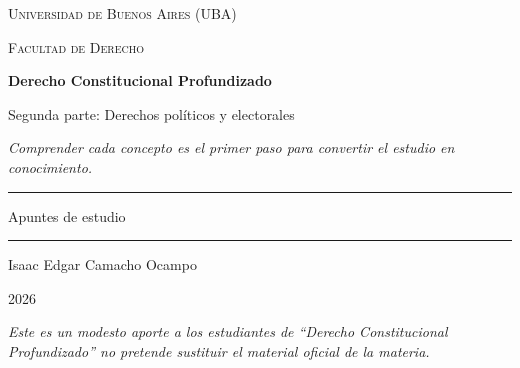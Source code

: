\documentclass[12pt,oneside]{book}
\newcommand{\universidad}{Universidad de Buenos Aires (UBA)}
\newcommand{\facultad}{Facultad de Derecho}
\newcommand{\materia}{Derecho Constitucional Profundizado}
\newcommand{\titulo}{Segunda parte: Derechos políticos y electorales}
\newcommand{\autor}{Isaac Edgar Camacho Ocampo}
\newcommand{\anio}{2026}
\newcommand{\reflexion}{Comprender cada concepto es el primer paso para convertir el estudio en conocimiento.}
\begin{document}
\begin{titlepage}

\thispagestyle{empty}

\begin{center}

\vspace*{1cm}

{\large \textsc{\universidad}}

\vspace{0.2cm}

{\large \textsc{\facultad}}

\vspace{3cm}

{\Huge \textbf{\materia}}

\vspace{1cm}

{\LARGE \titulo}

\vspace{0.8cm}

\textit{\reflexion}

\vspace{1.2cm}

\rule{0.70\textwidth}{0.5pt}

\vspace{0.5cm}

{\large Apuntes de estudio}

\vspace{0.5cm}

\rule{0.70\textwidth}{0.5pt}

\vfill

{\large \autor}

\vspace{0.3cm}

{\large \anio}

\end{center}

\vfill

\begin{flushleft}
\textit{Este es un modesto aporte a los estudiantes de ``\materia'' no pretende sustituir el material oficial de la materia.}
\end{flushleft}

\end{titlepage}

\frontmatter
\tableofcontents
\mainmatter
\end{document}
